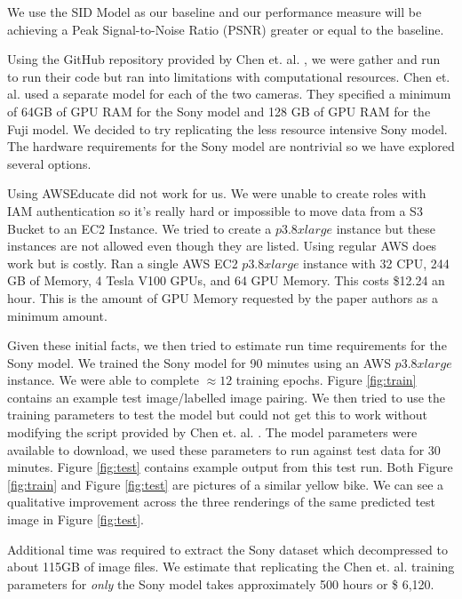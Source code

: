 \documentclass{article}
\begin{document}
We use the SID Model as our baseline and our performance measure will be achieving a Peak Signal-to-Noise Ratio (PSNR) greater or equal to the baseline.

Using the GitHub repository provided by Chen et. al. \cite{chen2018learning},
we were gather and run to run their code but ran into limitations with computational
resources. Chen et. al. \cite{chen2018learning} used a separate model for
each of the two cameras. They specified a minimum of 64GB of GPU RAM for the
Sony model and 128 GB of GPU RAM for the Fuji model. We decided to try
replicating the less resource intensive Sony model. The hardware
requirements for the Sony model are nontrivial so we have explored
several options.\newline

Using AWSEducate did not work for us. We were unable to create roles with
IAM authentication so it's really hard or impossible to move data from a
S3 Bucket to an EC2 Instance. We tried to create a $p3.8xlarge$ instance but
these instances are not allowed even though they are listed. Using regular
AWS does work but is costly. Ran a single AWS EC2 $p3.8xlarge$ instance
with 32 CPU, 244 GB of Memory, 4 Tesla V100 GPUs, and 64 GPU Memory. This
costs \$12.24 an hour. This is the amount of GPU Memory requested by the
paper authors as a minimum amount. \newline

Given these initial facts, we then tried to estimate run time requirements
for the Sony model. We trained the Sony model for 90 minutes using an
AWS $p3.8xlarge$ instance. We were able to complete $\approx 12$ training
epochs. Figure \ref{fig:train} contains an example test image/labelled image
pairing. We then tried to use the training parameters to
test the model but could not get this to work without modifying the script
provided by Chen et. al. \cite{chen2018learning}. The model parameters
were available to download, we used these parameters to run against test
data for 30 minutes. Figure \ref{fig:test} contains example output from this
test run. Both Figure \ref{fig:train} and Figure \ref{fig:test}
are pictures of a similar yellow bike. We can see a qualitative improvement
across the three renderings of the same predicted test image in
Figure \ref{fig:test}.

Additional time was required to extract the Sony dataset
which decompressed to about 115GB of image files. We estimate that
replicating the Chen et. al. \cite{chen2018learning} training parameters
for \textit{only} the Sony model takes approximately 500 hours or
\$ 6,120.
\end{document}
